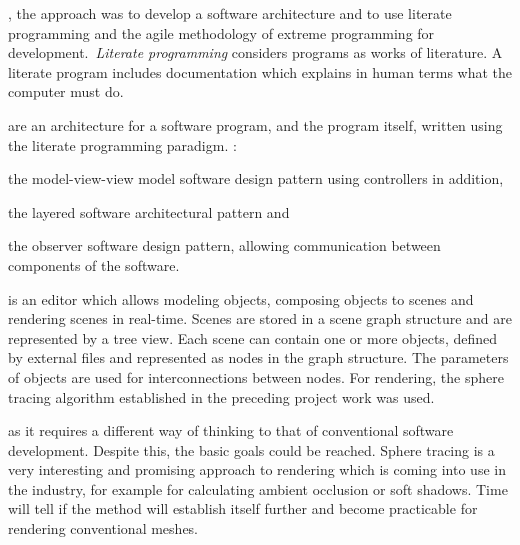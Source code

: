 \documentclass[%
    a4paper,    %
    justified,  %
    nobib,      %
    openany     %
]{tufte-book}
\begin{document}
, the approach was to develop a software
architecture and to use literate programming and the agile methodology of
extreme programming for development.~\emph{Literate programming} considers
programs as works of literature. A literate program includes documentation which
explains in human terms what the computer must do.

 are an architecture for a software
program, and the program itself, written using the literate programming
paradigm.
:
\begin{enumerate*}
  \item the model-view-view model software design pattern using controllers in
    addition,
  \item the layered software architectural pattern and
  \item the observer software design pattern, allowing communication between
    components of the software.
\end{enumerate*}

 is an editor which allows modeling objects,
composing objects to scenes and rendering scenes in real-time. Scenes are stored
in a scene graph structure and are represented by a tree view. Each scene can
contain one or more objects, defined by external files and represented as nodes
in the graph structure. The parameters of objects are used for interconnections
between nodes. For rendering, the sphere tracing algorithm established in the
preceding project work was used.

 as it requires a
different way of thinking to that of conventional software development. Despite
this, the basic goals could be reached. Sphere tracing is a very interesting and
promising approach to rendering which is coming into use in the industry, for
example for calculating ambient occlusion or soft shadows. Time will tell if the
method will establish itself further and become practicable for rendering
conventional meshes.
\tableofcontents{}
\listoffigures{}
\listoftables{}
\end{document}
